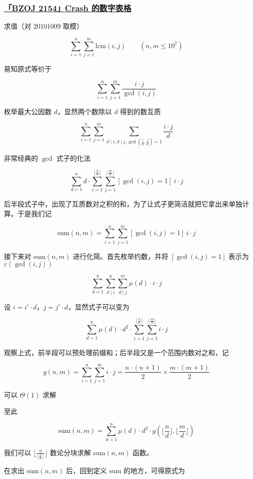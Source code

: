 \subsubsection{\href{https://www.lydsy.com/JudgeOnline/problem.php?id=2154}{「BZOJ 2154」Crash 的数字表格}}

求值（对 $20101009$ 取模）

$$
\sum_{i=1}^n\sum_{j=1}^m\text{lcm}(i,j)\qquad (n,m\leqslant 10^7)
$$

易知原式等价于

$$
\sum_{i=1}^n\sum_{j=1}^m\frac{i\cdot j}{\gcd(i,j)}
$$

枚举最大公因数 $d$，显然两个数除以 $d$ 得到的数互质

$$
\sum_{i=1}^n\sum_{j=1}^m\sum_{d\mid i,d\mid j,\gcd(\frac{i}{d},\frac{j}{d})=1}\frac{i\cdot j}{d}
$$

非常经典的 $\gcd$ 式子的化法

$$
\sum_{d=1}^n d\cdot\sum_{i=1}^{\lfloor\frac{n}{d}\rfloor}\sum_{j=1}^{\lfloor\frac{m}{d}\rfloor}[\gcd(i,j)=1]\ i\cdot j
$$

后半段式子中，出现了互质数对之积的和，为了让式子更简洁就把它拿出来单独计算。于是我们记

$$
\text{sum}(n,m)=\sum_{i=1}^n\sum_{j=1}^m [\gcd(i,j)=1]\  i\cdot j
$$

接下来对 $\text{sum}(n,m)$ 进行化简。首先枚举约数，并将 $[\gcd(i,j)=1]$ 表示为 $\varepsilon(\gcd(i,j))$

$$
\sum_{d=1}^n\sum_{d\mid i}^n\sum_{d\mid j}^m\mu(d)\cdot i\cdot j
$$

设 $i=i'\cdot d$，$j=j'\cdot d$，显然式子可以变为

$$
\sum_{d=1}^n\mu(d)\cdot d^2\cdot\sum_{i=1}^{\lfloor\frac{n}{d}\rfloor}\sum_{j=1}^{\lfloor\frac{m}{d}\rfloor}i\cdot j
$$

观察上式，前半段可以预处理前缀和；后半段又是一个范围内数对之和，记

$$
g(n,m)=\sum_{i=1}^n\sum_{j=1}^m i\cdot j=\frac{n\cdot(n+1)}{2}\times\frac{m\cdot(m+1)}{2}
$$

可以 $\Theta(1)$ 求解

至此

$$
\text{sum}(n,m)=\sum_{d=1}^n\mu(d)\cdot d^2\cdot g(\lfloor\frac{n}{d}\rfloor,\lfloor\frac{m}{d}\rfloor)
$$

我们可以 $\lfloor\frac{n}{\lfloor\frac{n}{d}\rfloor}\rfloor$ 数论分块求解 $\text{sum}(n,m)$ 函数。

在求出 $\text{sum}(n,m)$ 后，回到定义 $\text{sum}$ 的地方，可得原式为

